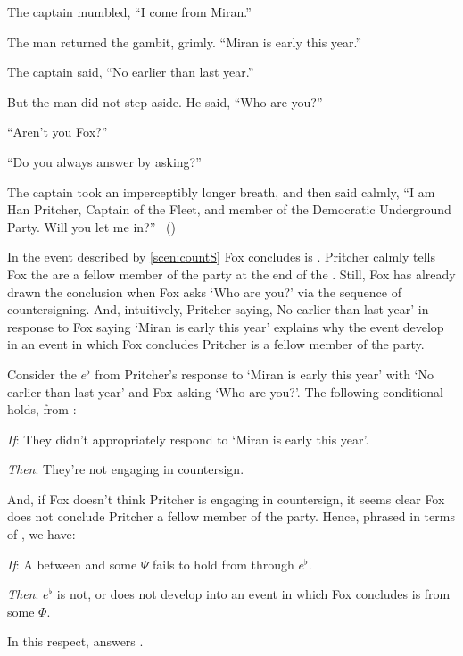 \begin{note}
  \begin{scenario}[Countersign]
    \label{scen:countS}
    \indent The captain mumbled, ``I come from Miran.''

    The man returned the gambit, grimly.
    ``Miran is early this year.''

    The captain said, ``No earlier than last year.''

    But the man did not step aside.
    He said, ``Who are you?''

    ``Aren't you Fox?''

    ``Do you always answer by asking?''

    The captain took an imperceptibly longer breath, and then said calmly,
    ``I am Han Pritcher, Captain of the Fleet, and member of the Democratic Underground Party.
    Will you let me in?''%
    \mbox{ }\hfill\mbox{(\cite[70]{Asimov:1945aa})}%
    \newline
  \end{scenario}

  \noindent%
  In the event described by \autoref{scen:countS} Fox concludes  is .
  Pritcher calmly tells Fox the are a fellow member of the party at the end of the \scen{}.
  Still, Fox has already drawn the conclusion when Fox asks `Who are you?' via the sequence of countersigning.
  And, intuitively, Pritcher saying, No earlier than last year' in response to Fox saying `Miran is early this year' explains why the event develop in an event in which Fox concludes Pritcher is a fellow member of the party.

  Consider the  \(e^{\flat}\) from Pritcher's response to `Miran is early this year' with `No earlier than last year' and Fox asking `Who are you?'.
  The following conditional holds, from :
  \begin{itenum}
  \item[\emph{If}:]
    They didn't appropriately respond to `Miran is early this year'.
  \item[\emph{Then}:]
    They're not engaging in countersign.
  \end{itenum}
  And, if Fox doesn't think Pritcher is engaging in countersign, it seems clear Fox does not conclude Pritcher a fellow member of the party.
  Hence, phrased in terms of \ros{}, we have:
  \begin{itenum}
  \item[\emph{If}:]
    A \ros{} between  and some \pool{} \(\Psi\) fails to hold from  through \(e^{\flat}\).
  \item[\emph{Then}:]
    \(e^{\flat}\) is not, or does not develop into an event in which Fox concludes  is  from some \pool{} \(\Phi\).
  \end{itenum}
  In this respect, \ros{} answers \qWhy{}.
\end{note}



